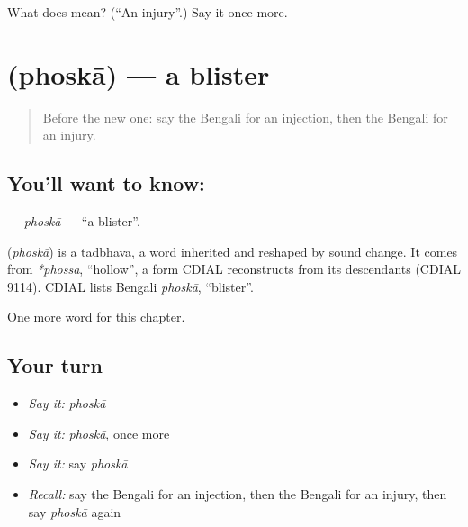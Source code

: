 \begin{tcolorbox}[breakable,colback=teal!4,colframe=teal!35!black,title={Before you move on}]
What does  mean? (\textquotedblleft{}An injury\textquotedblright{}.) Say it once more.
\end{tcolorbox}
\section[\texorpdfstring{\bn{ফোসকা} (phoskā)}{ফোসকা (phoskā)}]{ (phoskā) — a blister}

\label{lesson:BN-C185-phoska}



\begin{quote}
Before the new one: say the Bengali for an injection, then the Bengali for an injury.
\end{quote}

\subsection*{You'll want to know: }
\textbf{} — \emph{phoskā} — \textquotedblleft{}a blister\textquotedblright{}.

\begin{cousinweb}
\textbf{} (\emph{phoskā}) is a tadbhava, a word inherited and reshaped by sound change. It comes from \emph{*phossa}, \textquotedblleft{}hollow\textquotedblright{}, a form CDIAL reconstructs from its descendants (CDIAL 9114). CDIAL lists Bengali \emph{phoskā}, \textquotedblleft{}blister\textquotedblright{}.
\end{cousinweb}

\begin{grammarlens}[title={What you've built}]
One more word for this chapter.
\end{grammarlens}

\subsection*{Your turn}
\begin{itemize}
\raggedright
  \item \emph{Say it:} \emph{phoskā}
  \item \emph{Say it:} \emph{phoskā}, once more
  \item \emph{Say it:} say \emph{phoskā}
  \item \emph{Recall:} say the Bengali for an injection, then the Bengali for an injury, then say \emph{phoskā} again
\end{itemize}

